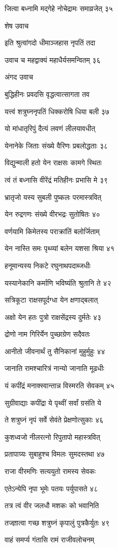 जित्वा बध्नामि मद्गेहे नोचेद्रामः समाव्रजेत् ३५

शेष उवाच

इति श्रुत्वांगदो धीमाञ्जहास नृपतिं तदा

उवाच च महद्वाक्यं महाधैर्यसमन्वितम् ३६

अंगद उवाच

बुद्धिहीनः प्रवदसि वृद्धत्वात्सागता तव

यत्त्वं शत्रुघ्ननृपतिं धिक्करोषि धिया बली ३७

यो मांधातृरिपुं दैत्यं लवणं लीलयावधीत्

येनानेके जिताः संख्ये वैरिणः प्रबलोद्धताः ३८

विद्युन्माली हतो येन राक्षसः कामगे स्थितः

त्वं तं बध्नासि वीरेंद्रं मतिहीनः प्रभासि मे ३९

भ्रातृजो यस्य सुबली पुष्कलः परमास्त्रवित्

येन रुद्रगणः संख्ये वीरभद्रः सुतोषितः ४०

वर्णयामि किमेतस्य पराक्रांतिं बलोर्जिताम्

येन नास्ति समः पृथ्व्यां बलेन यशसा श्रिया ४१

हनूमान्यस्य निकटे रघुनाथपदाब्जधीः

यस्यानेकानि कर्माणि भविष्यंति श्रुतानि ते ४२

सत्रिकूटा राक्षसपूर्दग्धा येन क्षणाद्बलात्

अक्षो येन हतः पुत्रो राक्षसेंद्रस्य दुर्मतेः ४३

द्रोणो नाम गिरिर्येन पुच्छाग्रेण सदैवतः

आनीतो जीवनार्थं तु सैनिकानां मुहुर्मुहुः ४४

जानाति रामश्चारित्रं नान्यो जानाति मूढधीः

यं कपींद्रं मनाक्स्वान्तान्न विस्मरति सेवकम् ४५

सुग्रीवाद्याः कपींद्रा ये पृथ्वीं सर्वां ग्रसंति ये

ते शत्रुघ्नं नृपं सर्वे सेवंते प्रेक्षणोत्सुकाः ४६

कुशध्वजो नीलरत्नो रिपुतापो महास्त्रवित्

प्रतापाग्र्यः सुबाहुश्च विमलः सुमदस्तथा ४७

राजा वीरमणिः सत्ययुतो रामस्य सेवकः

एतेऽन्येपि नृपा भूमेः पतयः पर्युपासते ४८

तत्र त्वं वीर जलधौ मशकः को भवानिति

तज्ज्ञात्वा गच्छ शत्रुघ्नं कृपालुं पुत्रकैर्युतः ४९

वाहं समर्प्य गंतासि रामं राजीवलोचनम्

